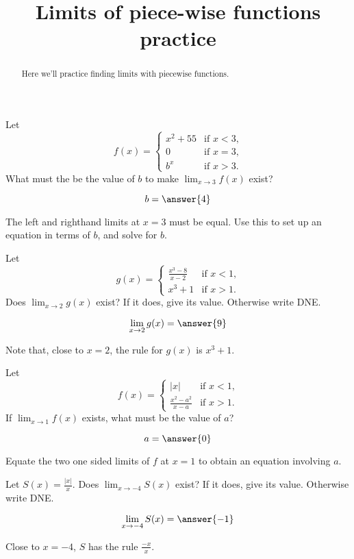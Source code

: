\documentclass[handout]{ximera}
\title[Exercises:]{Limits of piece-wise functions practice}
\begin{document}
\begin{abstract}
  Here we'll practice finding limits with piecewise functions.
\end{abstract}
\maketitle

\begin{exercise}
Let
\[
f(x) =
\begin{cases} x^2+55 &\text{if $x<3$,}\\
  0 &\text{if $x=3$,} \\
  b^x &\text{if $x>3$.}
\end{cases}
\]  
What must the be the value of $b$ to make $\displaystyle\lim_{x \to 3} f(x)$ exist?

\[
b = \answer{4}
\]

\begin{hint}
  The left and righthand limits at $x=3$ must be equal.  Use this to
  set up an equation in terms of $b$, and solve for $b$.
\end{hint}
\end{exercise}

\begin{exercise}
Let
\[
g(x) = \begin{cases}
  \frac{x^3 - 8}{x-2}  &\text{if $x<1$,} \\
  x^3+1 &\text{if  $x>1$.}
\end{cases}
\]
Does $\displaystyle\lim_{x \to 2} g(x)$ exist?  If it does, give its value.
Otherwise write DNE.

\[
\lim_{x \to 2} g(x) = \answer{9}
\]

\begin{hint}
	Note that, close to $x=2$, the rule for $g(x)$ is $x^3+1$.
\end{hint}

\end{exercise}


\begin{exercise}
Let
\[
f(x) = \begin{cases}
  |x| &\text{if $x<1$,} \\
  \frac{x^2-a^2}{x-a} &\text{if $x>1$.}
\end{cases}
\]
If $\displaystyle\lim_{x \to 1} f(x)$ exists, what must be the value of $a$?

  \[
a = \answer{0}
\]

\begin{hint}
  Equate the two one sided limits of $f$ at $x=1$ to obtain an equation involving $a$.
\end{hint}

\end{exercise}

\begin{exercise}
Let $S(x) = \frac{|x|}{x}$.  Does $\displaystyle\lim_{x \to -4} S(x)$ exist?  If it
does, give its value.  Otherwise write DNE.

\[
\lim_{x \to -4} S(x) = \answer{-1}
\] 

\begin{hint}
  Close to $x=-4$, $S$ has the rule $\frac{-x}{x}$.
\end{hint}


\end{exercise}
\end{document}
